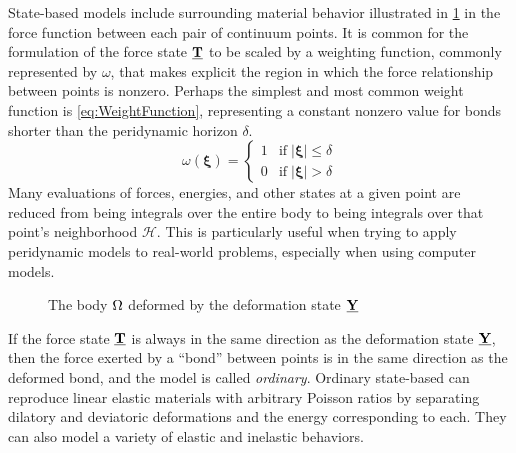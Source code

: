 State-based models include surrounding material behavior illustrated in \cref{fig:pdDeformed} in the force function between each pair of continuum points. 
It is common for the formulation of the force state $\vstate{T}{}{}$ to be scaled by a weighting function, commonly represented by $\omega$, that makes explicit the region in which the force relationship between points is nonzero.
Perhaps the simplest and most common weight function is \cref{eq:WeightFunction}, representing a constant nonzero value for bonds shorter than the peridynamic horizon $\delta$.
%
\begin{equation}
\label{eq:WeightFunction}
\omega(\boldsymbol{\xi}) = 
\begin{cases}
1 & \text{if}\; |\boldsymbol{\xi}| \leq \delta \\
0 & \text{if}\; |\boldsymbol{\xi}| > \delta
\end{cases}
\end{equation}
%
Many evaluations of forces, energies, and other states at a given point are reduced from being integrals over the entire body to being integrals over that point's neighborhood $\mathcal{H}$.
This is particularly useful when trying to apply peridynamic models to real-world problems, especially when using computer models. 
%
\begin{figure}[h]
  \centering
{}
\caption{The body \protect\(\protect\Omega\protect\) deformed by the deformation state \protect\(\protect\vstate{Y}{}{}\protect\)}
\label{fig:pdDeformed}
\end{figure}
%
If the force state $\vstate{T}{}{}$ is always in the same direction as the deformation state $\vstate{Y}{}{}$, then the force exerted by a ``bond'' between points is in the same direction as the deformed bond, and the model is called \textit{ordinary}.  
Ordinary state-based can reproduce linear elastic materials with arbitrary Poisson ratios by separating dilatory and deviatoric deformations and the energy corresponding to each.
They can also model a variety of elastic and inelastic behaviors.


